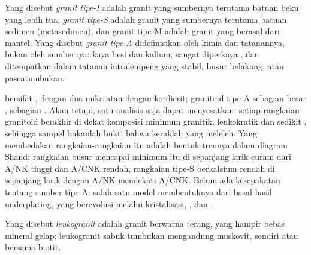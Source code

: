 \begin{definition}\label{def:b2:crustal-melting:types}
Yang disebut \emph{granit tipe-I} adalah granit yang sumbernya terutama
batuan beku yang lebih tua, \emph{granit tipe-S} adalah granit yang sumbernya
terutama batuan sedimen (metasedimen), dan granit tipe-M adalah granit yang berasal dari
mantel. Yang disebut \emph{granit tipe-A} didefinisikan oleh kimia dan
tatanannya, bukan oleh sumbernya: kaya besi dan kalium, sangat diperkaya , dan ditempatkan dalam tatanan intralempeng yang stabil, busur belakang, atau pascatumbukan.
\end{definition}

 bersifat , dengan dua mika atau dengan kordierit; granitoid tipe-A
sebagian besar , sebagian . Akan tetapi, satu analisis saja dapat menyesatkan: setiap
rangkaian granitoid berakhir di dekat komposisi minimum granitik, leukokratik dan sedikit
, sehingga sampel  bukanlah bukti bahwa keraklah yang meleleh. Yang membedakan
rangkaian-rangkaian itu adalah bentuk trennya dalam diagram Shand: rangkaian busur mencapai
minimum itu di sepanjang larik curam dari A/NK tinggi dan A/CNK rendah, rangkaian tipe-S berkalsium rendah
di sepanjang larik dengan A/NK mendekati A/CNK. Belum ada kesepakatan tentang sumber
 tipe-A: salah satu model membentuknya dari basal hasil underplating, yang berevolusi melalui kristalisasi,
, dan .

\begin{definition}[Leukogranit]\label{def:b2:crustal-melting:leucogranite}
Yang disebut \emph{leukogranit} adalah granit berwarna terang, yang hampir bebas
mineral gelap; leukogranit  sabuk tumbukan mengandung muskovit, sendiri atau
bersama biotit.
\end{definition}

